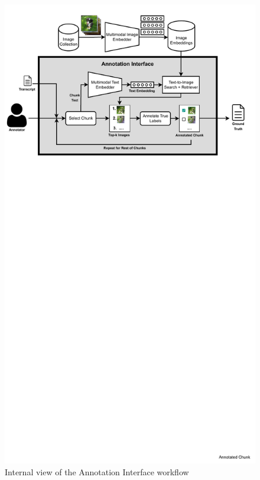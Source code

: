 \documentclass{l4proj}
\begin{document}
\begin{figure}[h]
    \centering
    \includegraphics[width=1\textwidth]{annotation_interface.pdf}
    \caption{Internal view of the Annotation Interface workflow}
    \label{fig:annotation_interface}
\end{figure}




\end{document}
